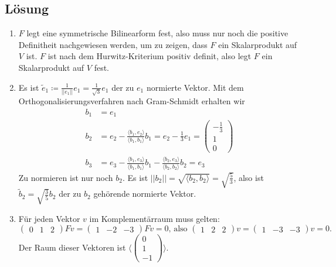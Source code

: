 \subsection{Lösung}
\begin{enumerate}
	\item \( F \) legt eine symmetrische Bilinearform fest, also muss nur noch die positive Definitheit nachgewiesen werden, um zu zeigen, dass \( F \) ein Skalarprodukt auf \( V \) ist. \( F \) ist nach dem Hurwitz-Kriterium positiv definit, also legt \( F \) ein Skalarprodukt auf \( V \) fest.
	\item Es ist \( \widetilde{e}_1 \coloneqq \tfrac{1}{||e_1||}e_1 = \tfrac{1}{\sqrt{3}}e_1 \) der zu \( e_1 \) normierte Vektor. Mit dem Orthogonalisierungsverfahren nach Gram-Schmidt erhalten wir
	\begin{align*}
		b_1 &= e_1 \\
		b_2 &= e_2 - \tfrac{\langle b_1, e_2 \rangle}{\langle b_1, b_1 \rangle}b_1 = e_2 - \tfrac{1}{3}e_1 = \left( \begin{smallmatrix}
			-\tfrac{1}{3} \\ 1 \\ 0
		\end{smallmatrix} \right) \\
		b_3 &= e_3 - \tfrac{\langle b_1, e_3 \rangle}{\langle b_1, b_1 \rangle}b_1 - \tfrac{\langle b_2, e_3 \rangle}{\langle b_2,b_2 \rangle}b_2 = e_3
	\end{align*}
	Zu normieren ist nur noch \( b_2 \). Es ist \( ||b_2|| = \sqrt{\langle b_2,b_2 \rangle} = \sqrt{\tfrac{5}{3}} \), also ist \( \widetilde{b}_2 = \sqrt{\tfrac{3}{5}}b_2 \) der zu \( b_2 \) gehörende normierte Vektor.
	\item Für jeden Vektor \( v \) im Komplementärraum muss gelten:
	\begin{equation*}
		\begin{pmatrix}
			0 & 1 & 2
		\end{pmatrix}Fv = \begin{pmatrix}
			1 & -2 & -3
		\end{pmatrix}Fv = 0\text{, also } \begin{pmatrix}
			1 & 2 & 2
		\end{pmatrix}v = \begin{pmatrix}
			1 & -3 & -3
		\end{pmatrix}v = 0\text{.}
	\end{equation*}
	Der Raum dieser Vektoren ist \( \langle \left( \begin{smallmatrix}
		0 \\ 1 \\ -1
	\end{smallmatrix} \right) \rangle \).
\end{enumerate}

